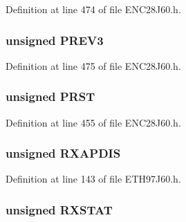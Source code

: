 Definition at line 474 of file E\+N\+C28\+J60.\+h.

\hypertarget{union_p_h_y_r_e_g_a4e57eb78159273ae1b345cc7b52bfd56}{}
\subsubsection[{P\+R\+E\+V3}]{\setlength{\rightskip}{0pt plus 5cm}unsigned P\+R\+E\+V3}\label{union_p_h_y_r_e_g_a4e57eb78159273ae1b345cc7b52bfd56}


Definition at line 475 of file E\+N\+C28\+J60.\+h.

\hypertarget{union_p_h_y_r_e_g_a56fcdc1e161680b29cbd3b57d2c15a3c}{}
\subsubsection[{P\+R\+S\+T}]{\setlength{\rightskip}{0pt plus 5cm}unsigned P\+R\+S\+T}\label{union_p_h_y_r_e_g_a56fcdc1e161680b29cbd3b57d2c15a3c}


Definition at line 455 of file E\+N\+C28\+J60.\+h.

\hypertarget{union_p_h_y_r_e_g_a8b3bce839581ffb4d51ea5dd8acab388}{}
\subsubsection[{R\+X\+A\+P\+D\+I\+S}]{\setlength{\rightskip}{0pt plus 5cm}unsigned R\+X\+A\+P\+D\+I\+S}\label{union_p_h_y_r_e_g_a8b3bce839581ffb4d51ea5dd8acab388}


Definition at line 143 of file E\+T\+H97\+J60.\+h.

\hypertarget{union_p_h_y_r_e_g_a55b4340aa1cddd21afad9eba4835f128}{}
\subsubsection[{R\+X\+S\+T\+A\+T}]{\setlength{\rightskip}{0pt plus 5cm}unsigned R\+X\+S\+T\+A\+T}\label{union_p_h_y_r_e_g_a55b4340aa1cddd21afad9eba4835f128}


